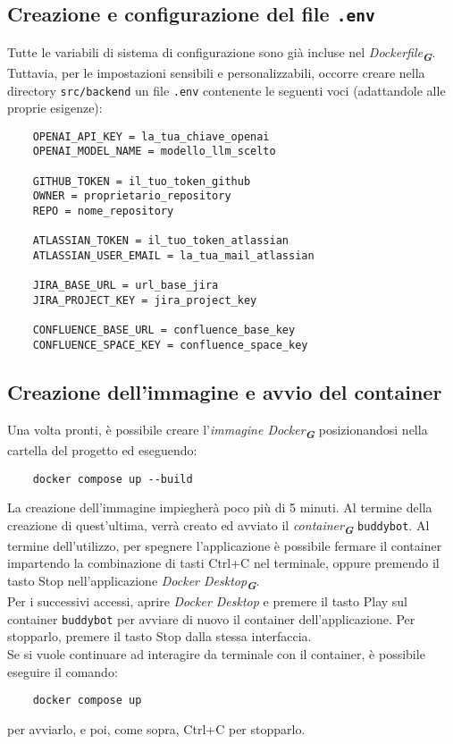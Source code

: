 \subsection{Creazione e configurazione del file \texttt{.env}}
Tutte le variabili di sistema di configurazione sono già incluse nel \emph{Dockerfile}\textsubscript{\textbf{\textit{G}}}.  
Tuttavia, per le impostazioni sensibili e personalizzabili, occorre creare nella directory \texttt{src/backend} un file
\texttt{.env} contenente le seguenti voci (adattandole alle proprie esigenze):
\begin{verbatim}
    OPENAI_API_KEY = la_tua_chiave_openai
    OPENAI_MODEL_NAME = modello_llm_scelto

    GITHUB_TOKEN = il_tuo_token_github
    OWNER = proprietario_repository
    REPO = nome_repository

    ATLASSIAN_TOKEN = il_tuo_token_atlassian
    ATLASSIAN_USER_EMAIL = la_tua_mail_atlassian

    JIRA_BASE_URL = url_base_jira
    JIRA_PROJECT_KEY = jira_project_key

    CONFLUENCE_BASE_URL = confluence_base_key
    CONFLUENCE_SPACE_KEY = confluence_space_key
\end{verbatim}

\subsection{Creazione dell'immagine e avvio del container}
Una volta pronti, è possibile creare l'\emph{immagine Docker}\textsubscript{\textbf{\textit{G}}} posizionandosi nella cartella del progetto ed eseguendo:
\begin{verbatim}
    docker compose up --build
\end{verbatim}
La creazione dell'immagine impiegherà poco più di 5 minuti.
Al termine della creazione di quest'ultima, verrà creato ed avviato il \emph{container}\textsubscript{\textbf{\textit{G}}} \texttt{buddybot}. Al termine dell'utilizzo, per
spegnere l'applicazione è possibile fermare il container impartendo la combinazione di tasti Ctrl+C nel terminale, oppure premendo il tasto Stop nell'applicazione \emph{Docker Desktop}\textsubscript{\textbf{\textit{G}}}.\\
Per i successivi accessi, aprire \emph{Docker Desktop} e premere il tasto Play sul container \texttt{buddybot} per avviare di nuovo il
container dell'applicazione. Per stopparlo, premere il tasto Stop dalla stessa interfaccia.\\
Se si vuole continuare ad interagire da terminale con il container, è possibile eseguire il comando:
\begin{verbatim}
    docker compose up
\end{verbatim}
per avviarlo, e poi, come sopra, Ctrl+C per stopparlo.

